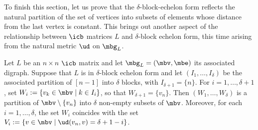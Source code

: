 To finish this section, let us prove that the $\delta$-block-echelon
form reflects the natural partition of the set of vertices into
subsets of elements whose distance from the last vertex is constant.
This brings out another aspect of the relationship between $\icb$
matrices $L$ and $\delta$-block echelon form, this time arising from
the natural metric $\ud$ on $\mbg_{L}$.

\begin{lemma}\label{blockthenomega}
Let $L$ be an $n\times n$ $\icb$ matrix and let $\mbg_L=(\mbv,\mbe)$
its associated digraph. Suppose that $L$ is in $\delta$-block echelon
form and let $(I_1,\ldots, I_\delta)$ be the associated partition of
$[n-1]$ into $\delta$ blocks, with $I_{\delta+1}=\{n\}$. For
$i=1,\ldots ,\delta+1$, set $W_i:=\{v_k\in\mbv\mid k\in I_i\}$, so
that $W_{\delta+1}=\{v_n\}$. Then $(W_1,\ldots ,W_{\delta})$ is a
partition of $\mbv\setminus\{v_n\}$ into $\delta$ non-empty subsets of
$\mbv$. Moreover, for each $i=1,\ldots, \delta$, the set $W_i$
coincides with the set $V_i:=\{v\in\mbv\mid \ud(v_n,v)=\delta+1-i\}$.
\end{lemma}
